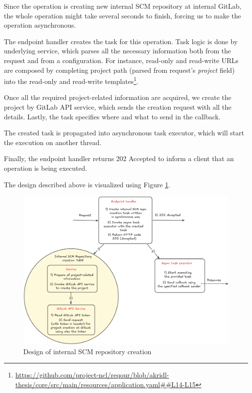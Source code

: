 \documentclass[./main.tex]{subfiles}
\begin{document}
Since the operation is creating new internal SCM repository at internal GitLab, the whole operation might take several seconds to finish, forcing us to make the operation asynchronous.

The endpoint handler creates the task for this operation. Task logic is done by underlying service, which parses all the necessary information both from the request and from a configuration. For instance, read-only and read-write URLs are composed by completing project path (parsed from request's \textit{project} field) into the read-only and read-write templates\footnote{\url{https://github.com/project-ncl/reqour/blob/akridl-thesis/core/src/main/resources/application.yaml##L14-L15}}.

Once all the required project-related information are acquired, we create the project by GitLab API service, which sends the creation request with all the details. Lastly, the task specifies where and what to send in the callback.

The created task is propagated into asynchronous task executor, which will start the execution on another thread.

Finally, the endpoint handler returns 202 Accepted to inform a client that an operation is being executed.

The design described above is visualized using Figure \ref{fig:internal-scm-design}.

\begin{figure}
  \begin{center}
    \includegraphics[width=\textwidth]{images/internal-scm-design.png}
  \end{center}
  \caption{Design of internal SCM repository creation}
  \label{fig:internal-scm-design}
\end{figure}
\end{document}
